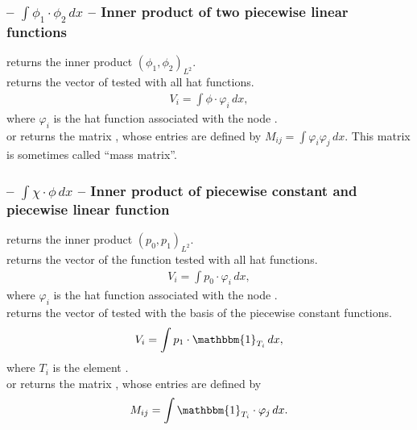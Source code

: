 \documentclass[twoside,11pt,a4paper]{article} %
\begin{document}
\subsubsection*{\texorpdfstring{ -- $\int \phi_1 \cdot \phi_2 \,dx$ --}{} Inner product of two piecewise linear functions}
 returns the inner product $(\phi_1, \phi_2)_{L^2}$. \\
 returns the vector  of  tested with all hat functions.
\begin{align*}
 V_i = \int \phi \cdot \varphi_i \,dx,
\end{align*}
where $\varphi_i$ is the hat function associated with the node . \\
 or  returns the matrix , whose entries are defined by $M_{ij} = \int \varphi_i \varphi_j \,dx$.
This matrix is sometimes called \enquote{mass matrix}.

\subsubsection*{\texorpdfstring{ -- $\int \chi \cdot \phi \,dx$ --}{} Inner product of piecewise constant and piecewise linear function}
 returns the inner product $(p_0, p_1)_{L^2}$. \\
 returns the vector  of the function  tested with all hat functions.
\begin{align*}
 V_i = \int p_0 \cdot \varphi_i \,dx,
\end{align*}
where $\varphi_i$ is the hat function associated with the node . \\
 returns the vector  of  tested with the basis of the piecewise constant functions.
\begin{align*}
 V_i = \int p_1 \cdot \mathbbm{1}_{T_i} \,dx,
\end{align*}
where $T_i$ is the element . \\
 or  returns the matrix , whose entries are defined by \begin{align*}
M_{ij} = \int \mathbbm{1}_{T_i} \cdot \varphi_j \,dx.
\end{align*}
\end{document}
